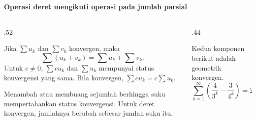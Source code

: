 \documentclass{../../kalkulus-ppt}
\begin{document}
\begin{frame}{\insertsection}
    \framesubtitle{Operasi deret mengikuti operasi pada jumlah parsial}
    \begin{columns}[c,onlytextwidth]
        \begin{column}{.52\textwidth}
            \begin{teorema}
                Jika $\sum u_k$ dan $\sum v_k$ konvergen, maka
                \[
                    \sum(u_k\pm v_k)=\sum u_k\pm\sum v_k.
                \]
                Untuk $c\ne0$, $\sum cu_k$ dan $\sum u_k$
                mempunyai status konvergensi yang sama.
                Bila konvergen, $\sum cu_k=c\sum u_k$.
            \end{teorema}
            Menambah atau membuang sejumlah berhingga suku
            mempertahankan status konvergensi. Untuk deret
            konvergen, jumlahnya berubah sebesar jumlah suku itu.
        \end{column}
        \begin{column}{.44\textwidth}
            \begin{contoh}
                Kedua komponen berikut adalah geometrik konvergen.
                \[
                    \sum_{k=1}^\infty
                        \left(\frac4{3^k}-\frac3{4^k}\right)
                    =2-1=1.
                \]
            \end{contoh}
        \end{column}
    \end{columns}
\end{frame}
\end{document}
